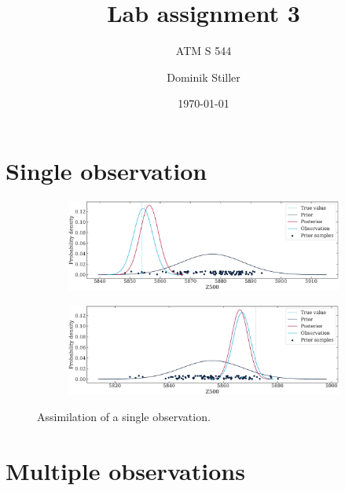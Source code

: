 \documentclass[parskip=half,DIV=12]{scrartcl}
\title{Lab assignment 3}
\subtitle{ATM S 544}
\author{Dominik Stiller}
\date{\today}
\begin{document}
\maketitle




\section{Single observation}

\begin{figure}[h]
    \centering
 
    \begin{subfigure}[c]{\textwidth}
       \includegraphics[width=\textwidth]{figures/single_point1.pdf}
    \end{subfigure}
     
    \bigskip
     
    \begin{subfigure}[c]{\textwidth}
       \includegraphics[width=\textwidth]{figures/single_point2.pdf}
    \end{subfigure}
 
    \caption{Assimilation of a single observation.}
 \end{figure}



\section{Multiple observations}
\end{document}
